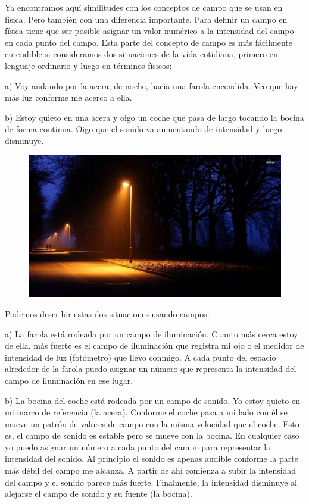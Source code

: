 Ya encontramos aquí similitudes con los conceptos de campo que se usan en física. Pero también con una diferencia importante. Para definir un campo en física tiene que ser posible asignar un valor numérico a la intensidad del campo en cada punto del campo. Esta parte del concepto de campo es más fácilmente entendible si consideramos dos situaciones de la vida cotidiana, primero en lenguaje ordinario y luego en términos físicos:

a) Voy andando por la acera, de noche, hacia una farola encendida. Veo que hay más luz conforme me acerco a ella.

b) Estoy quieto en una acera y oigo un coche que pasa de largo tocando la bocina de forma continua. Oigo que el sonido va aumentando de intensidad y luego disminuye.

	\begin{figure}[H]
	\centering
	\includegraphics[width=.8\textwidth]{imagenes/imagenescv/ExperientiaDocet02.png}
	\end{figure}

Podemos describir estas dos situaciones usando campos:

a) La farola está rodeada por un campo de iluminación. Cuanto más cerca estoy de ella, más fuerte es el campo de iluminación que registra mi ojo o el medidor de intensidad de luz (fotómetro) que llevo conmigo. A cada punto del espacio alrededor de la farola puedo asignar un número que representa la intensidad del campo de iluminación en ese lugar.

b) La bocina del coche está rodeada por un campo de sonido. Yo estoy quieto en mi marco de referencia (la acera). Conforme el coche pasa a mi lado con él se mueve un patrón de valores de campo con la misma velocidad que el coche. Esto es, el campo de sonido es estable pero se mueve con la bocina. En cualquier caso yo puedo asignar un número a cada punto del campo para representar la intensidad del sonido. Al principio el sonido es apenas audible conforme la parte más débil del campo me alcanza. A partir de ahí comienza a subir la intensidad del campo y el sonido parece más fuerte. Finalmente, la intensidad disminuye al alejarse el campo de sonido y su fuente (la bocina).


